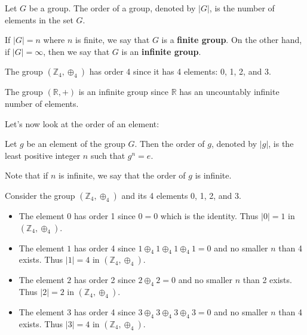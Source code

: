 \begin{definition}
    Let $G$ be a group. The order of a group, denoted by $|G|$, is the number of elements in the set $G$.
\end{definition}

If $|G| = n$ where $n$ is finite, we say that $G$ is a \textbf{finite group}. On the other hand, if $|G| = \infty$, then we say that $G$ is an \textbf{infinite group}.

\begin{example}
    The group $(\mathbb{Z}_4, \oplus_4)$ has order 4 since it has 4 elements: 0, 1, 2, and 3.
\end{example}

\begin{example}
    The group $(\mathbb{R}, +)$ is an infinite group since $\mathbb{R}$ has an uncountably infinite number of elements.
\end{example}

Let's now look at the order of an element:
\begin{definition}
    Let $g$ be an element of the group $G$. Then the order of $g$, denoted by $|g|$, is the least positive integer $n$ such that $g^n = e$.
\end{definition}
Note that if $n$ is infinite, we say that the order of $g$ is infinite.

\begin{example}
    Consider the group $(\mathbb{Z}_4, \oplus_4)$ and its 4 elements 0, 1, 2, and 3.
    \begin{itemize}
        \item The element $0$ has order 1 since $0 = 0$ which is the identity. Thus $|0| = 1$ in $(\mathbb{Z}_4, \oplus_4)$.
        \item The element $1$ has order 4 since $1 \oplus_4 1 \oplus_4 1 \oplus_4 1 = 0$ and no smaller $n$ than 4 exists. Thus $|1| = 4$ in $(\mathbb{Z}_4, \oplus_4)$.
        \item The element $2$ has order 2 since $2 \oplus_4 2 = 0$ and no smaller $n$ than 2 exists. Thus $|2| = 2$ in $(\mathbb{Z}_4, \oplus_4)$.
        \item The element $3$ has order 4 since $3 \oplus_4 3 \oplus_4 3 \oplus_4 3 = 0$ and no smaller $n$ than 4 exists. Thus $|3| = 4$ in $(\mathbb{Z}_4, \oplus_4)$.
    \end{itemize}
\end{example}

\newpage

